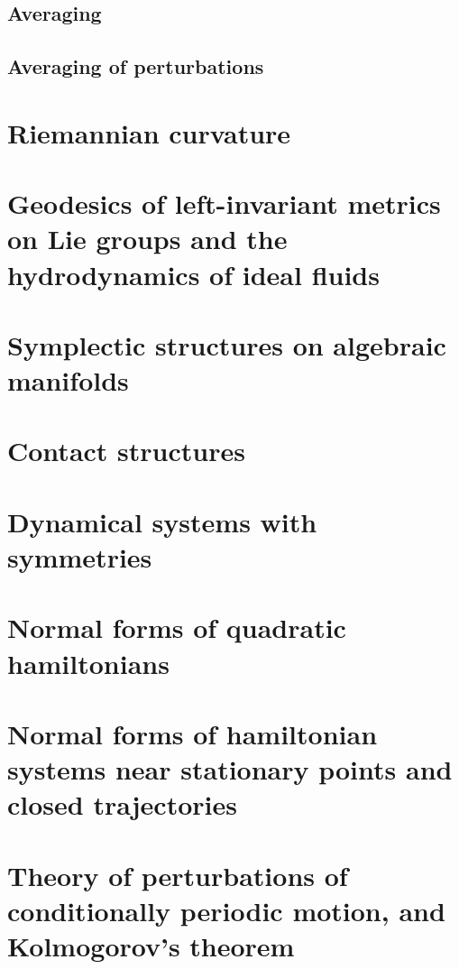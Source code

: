 \documentclass{book}
\numberwithin{equation}{section}
\theoremstyle{plain}
\theoremstyle{definition}
\theoremstyle{remark}
\theoremstyle{remark}
\begin{document}
\section{Averaging}

\section{Averaging of perturbations}

\appendix
\renewcommand{\thechapter}{\arabic{chapter}}

\chapter{Riemannian curvature}

\chapter{Geodesics of left-invariant metrics on Lie groups and
the hydrodynamics of ideal fluids}

\chapter{Symplectic structures on algebraic manifolds}

\chapter{Contact structures}

\chapter{Dynamical systems with symmetries}

\chapter{Normal forms of quadratic hamiltonians}

\chapter{Normal forms of hamiltonian systems near stationary points
and closed trajectories}

\chapter{Theory of perturbations of conditionally periodic motion,
and Kolmogorov's theorem}
\end{document}
